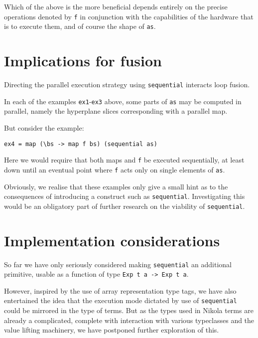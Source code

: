 Which of the above is the more beneficial depends entirely on the precise
operations denoted by \texttt{f} in conjunction with the capabilities of the
hardware that is to execute them, and of course the shape of \texttt{as}.

\section{Implications for fusion}

Directing the parallel execution strategy using \texttt{sequential} interacts
loop fusion.

In each of the examples \texttt{ex1}-\texttt{ex3} above, some parts of
\texttt{as} may be computed in parallel, namely the hyperplane slices
corresponding with a parallel map.

But consider the example:
\begin{verbatim}
ex4 = map (\bs -> map f bs) (sequential as)
\end{verbatim}

Here we would require that both maps and \texttt{f} be executed sequentially,
at least down until an eventual point where \texttt{f} acts only on single
elements of \texttt{as}.

Obviously, we realise that these examples only give a small hint as to the
consequences of introducing a construct such as \texttt{sequential}.
Investigating this would be an obligatory part of further research on the
viability of \texttt{sequential}.

\section{Implementation considerations}

So far we have only seriously considered making \texttt{sequential} an
additional primitive, usable as a function of type \texttt{Exp t a -> Exp t a}.

However, inspired by the use of array representation type tags, we have also
entertained the idea that the execution mode dictated by use of
\texttt{sequential} could be mirrored in the type of terms. But as the types
used in Nikola terms are already a complicated, complete with interaction with
various typeclasses and the value lifting machinery, we have postponed further
exploration of this.


